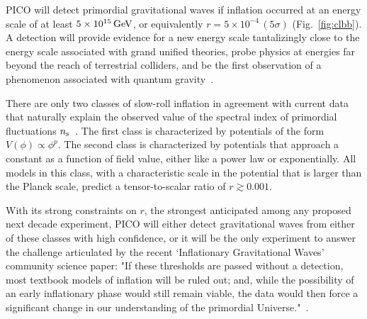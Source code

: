 \documentclass[PICOAPC.tex]{subfiles}
\begin{document}
PICO will detect primordial gravitational waves if inflation occurred at an energy scale of at least $5\times 10^{15}\,\rm{GeV}$, or equivalently $r= 5\times 10^{-4} \, (5\sigma)$ (Fig.~\ref{fig:clbb}).  A detection will provide evidence for a new energy scale tantalizingly close to the energy scale associated with grand unified theories, probe physics at energies far beyond the reach of terrestrial colliders, and be the first observation of a phenomenon associated with quantum gravity~\cite{Krauss:2013pha}. 

There are only two classes of slow-roll inflation in agreement with current data that naturally explain the observed value of the spectral index of primordial fluctuations $n_{\rm s}$~\cite{Aghanim:2018eyx}. The first class is characterized by potentials of the form $V(\phi)\propto\phi^p$. The second class is characterized by potentials that approach a constant as a function of field value, either like a power law or exponentially. All models in this class, with a characteristic scale in the potential that is larger than the Planck scale, predict a tensor-to-scalar ratio of $r\gtrsim 0.001$.

With its strong constraints on $r$, the strongest anticipated among any proposed next decade experiment, PICO will either detect gravitational waves from either of these classes with high confidence, or it will be the only experiment to answer the challenge articulated by the recent `Inflationary Gravitational Waves' community science paper: "If these thresholds are passed without a detection, most textbook models of inflation will be ruled out; and, while the possibility of an early inflationary phase would still remain viable, the data would then force a significant change in our understanding of the primordial Universe."~\cite{Shandera_etal}.

\end{document}
